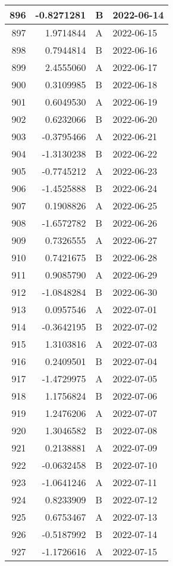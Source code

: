 \begin{tabular}{r|r|l|l}
\hline
896 & -0.8271281 & B & 2022-06-14\\
\hline
897 & 1.9714844 & A & 2022-06-15\\
\hline
898 & 0.7944814 & B & 2022-06-16\\
\hline
899 & 2.4555060 & A & 2022-06-17\\
\hline
900 & 0.3109985 & B & 2022-06-18\\
\hline
901 & 0.6049530 & A & 2022-06-19\\
\hline
902 & 0.6232066 & B & 2022-06-20\\
\hline
903 & -0.3795466 & A & 2022-06-21\\
\hline
904 & -1.3130238 & B & 2022-06-22\\
\hline
905 & -0.7745212 & A & 2022-06-23\\
\hline
906 & -1.4525888 & B & 2022-06-24\\
\hline
907 & 0.1908826 & A & 2022-06-25\\
\hline
908 & -1.6572782 & B & 2022-06-26\\
\hline
909 & 0.7326555 & A & 2022-06-27\\
\hline
910 & 0.7421675 & B & 2022-06-28\\
\hline
911 & 0.9085790 & A & 2022-06-29\\
\hline
912 & -1.0848284 & B & 2022-06-30\\
\hline
913 & 0.0957546 & A & 2022-07-01\\
\hline
914 & -0.3642195 & B & 2022-07-02\\
\hline
915 & 1.3103816 & A & 2022-07-03\\
\hline
916 & 0.2409501 & B & 2022-07-04\\
\hline
917 & -1.4729975 & A & 2022-07-05\\
\hline
918 & 1.1756824 & B & 2022-07-06\\
\hline
919 & 1.2476206 & A & 2022-07-07\\
\hline
920 & 1.3046582 & B & 2022-07-08\\
\hline
921 & 0.2138881 & A & 2022-07-09\\
\hline
922 & -0.0632458 & B & 2022-07-10\\
\hline
923 & -1.0641246 & A & 2022-07-11\\
\hline
924 & 0.8233909 & B & 2022-07-12\\
\hline
925 & 0.6753467 & A & 2022-07-13\\
\hline
926 & -0.5187992 & B & 2022-07-14\\
\hline
927 & -1.1726616 & A & 2022-07-15\\

\end{tabular}
